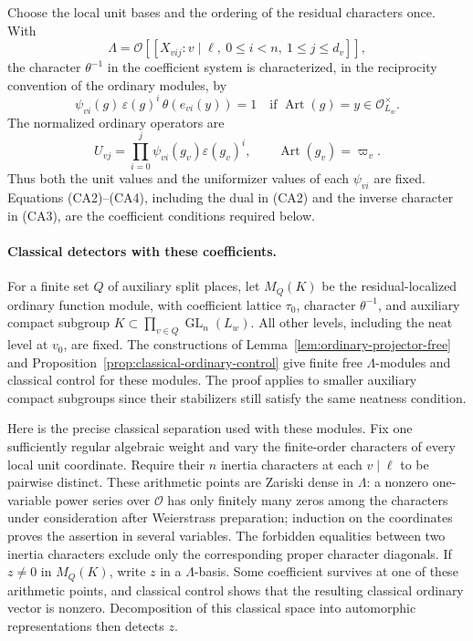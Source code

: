 Choose the local unit bases and the ordering of the residual
characters once. With
\[
 \Lambda=\mathcal O[[X_{vij}:
              v\mid\ell,\ 0\leq i<n,\ 1\leq j\leq d_v]],
\]
the character \(\theta^{-1}\) in the coefficient system is
characterized, in the reciprocity convention of the ordinary
modules, by
\[
 \psi_{vi}(g)\,\varepsilon(g)^i\,
       \theta(e_{vi}(y))=1
       \quad\text{if }\operatorname{Art}(g)=y\in\mathcal O_{L_w}^{\times}.
                                                               \tag{CA3}
\]
The normalized ordinary operators are
\[
 U_{vj}=\prod_{i=0}^{j}
              \psi_{vi}(g_v)\varepsilon(g_v)^i,
 \qquad \operatorname{Art}(g_v)=\varpi_v .
                                                               \tag{CA4}
\]
Thus both the unit values and the uniformizer values of
each \(\psi_{vi}\) are fixed. Equations (CA2)--(CA4), including
the dual in (CA2) and the inverse character in (CA3), are
the coefficient conditions required below.

\paragraph{Classical detectors with these coefficients.}
For a finite set \(Q\) of auxiliary split places, let
\(M_Q(K)\) be the residual-localized ordinary function module,
with coefficient lattice \(\tau_0\), character \(\theta^{-1}\),
and auxiliary compact subgroup
\(K\subset\prod_{v\in Q}\operatorname{GL}_n(L_w)\).
All other levels, including the neat level at \(v_0\), are fixed.
The constructions of
Lemma~\ref{lem:ordinary-projector-free} and
Proposition~\ref{prop:classical-ordinary-control} give finite
free \(\Lambda\)-modules and classical control for these
modules. The proof applies to smaller auxiliary compact
subgroups since their stabilizers still satisfy the same
neatness condition.

Here is the precise classical separation used with these
modules. Fix one sufficiently regular algebraic weight and
vary the finite-order characters of every local unit
coordinate. Require their \(n\) inertia characters at each
\(v\mid\ell\) to be pairwise distinct.
These arithmetic points are Zariski dense in \(\Lambda\):
a nonzero one-variable power series over \(\mathcal O\)
has only finitely many zeros among the characters under
consideration after Weierstrass preparation; induction on
the coordinates proves the assertion in several variables.
The forbidden equalities between two inertia characters
exclude only the corresponding proper character diagonals.
If \(z\ne0\) in \(M_Q(K)\), write \(z\) in a \(\Lambda\)-basis.
Some coefficient survives at one of these arithmetic points,
and classical control shows that the resulting classical
ordinary vector is nonzero. Decomposition of this classical
space into automorphic representations then detects \(z\).

